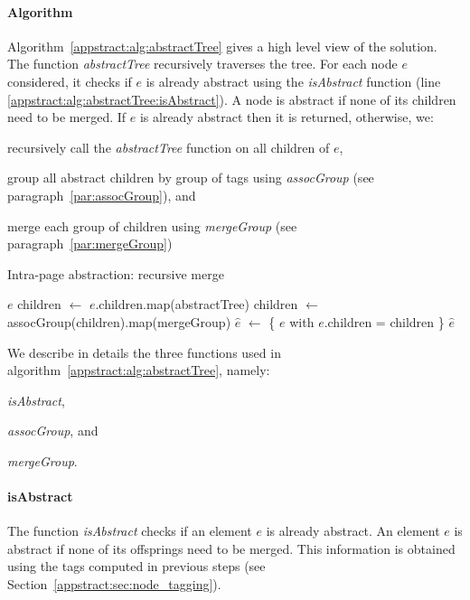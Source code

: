 \paragraph{Algorithm}
Algorithm~\ref{appstract:alg:abstractTree} gives a high level view of the solution.
The function \emph{abstractTree} recursively traverses the tree.
For each node $e$ considered, it checks if $e$ is already abstract using the \emph{isAbstract} function (line \ref{appstract:alg:abstractTree:isAbstract}).
A node is abstract if none of its children need to be merged.
If $e$ is already abstract then it is returned, otherwise, we:
\begin{compactenum}
  \item recursively call the \emph{abstractTree} function on all children of $e$,
  \item group all abstract children by group of tags using \emph{assocGroup} (see paragraph~\ref{par:assocGroup}), and
  \item merge each group of children using \emph{mergeGroup} (see paragraph~\ref{par:mergeGroup})
\end{compactenum}

\begin{algorithm}
\caption{Intra-page abstraction: recursive merge}\label{appstract:alg:abstractTree}
\begin{algorithmic}[1]
      \label{appstract:alg:abstractTree:isAbstract}
      \State \Return $e$
    \Else
      \State children $\gets$ $e$.children.map(abstractTree)
      \State children $\gets$ assocGroup(children).map(mergeGroup)
      \State $\hat{e}$ $\gets$ \{ $e$ with $e$.children = children \}
      \State \Return $\hat{e}$
    \EndIf
  \EndFunction
\end{algorithmic}
\end{algorithm}

We describe in details the three functions used in algorithm~\ref{appstract:alg:abstractTree}, namely:
\begin{inparaenum}
  \item \emph{isAbstract},
  \item \emph{assocGroup}, and
  \item \emph{mergeGroup}.
\end{inparaenum}

\paragraph{isAbstract}
The function \emph{isAbstract} checks if an element $e$ is already abstract.
An element $e$ is abstract if none of its offsprings need to be merged.
This information is obtained using the tags computed in previous steps (see Section~\ref{appstract:sec:node_tagging}).

